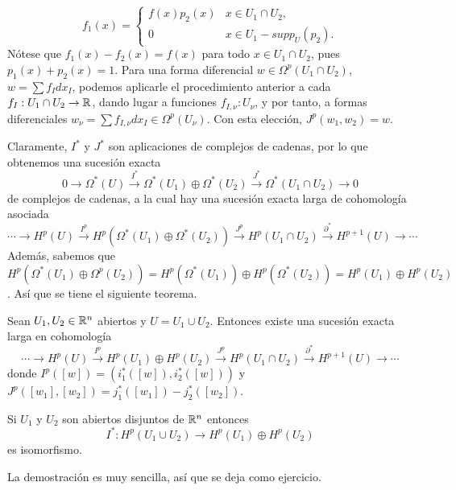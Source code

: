 \documentclass[CV.tex]{subfiles}
\begin{document}
\begin{dem}
\[
f_1(x)=\begin{cases}
f(x)p_2(x) & x\in U_1\cap U_2,\\
0 & x\in U_1-supp_U(p_2).
\end{cases}
\]
Nótese que $f_1(x)-f_2(x)=f(x)$ para todo $x\in U_1\cap U_2$, pues $p_1(x)+p_2(x)=1$. Para una forma diferencial $w\in \Omega^p(U_1\cap U_2)$, $w=\sum f_Idx_I$, podemos aplicarle el procedimiento anterior a cada $f_I:U_1\cap U_2\to\mathbb{R}$, dando lugar a funciones $f_{I,\nu}:U_{\nu}$, y por tanto, a formas diferenciales $w_{\nu}=\sum f_{I,\nu}dx_I\in\Omega^p(U_{\nu})$. Con esta elección, $J^p(w_1,w_2)=w$. 
\QED
\end{dem}

Claramente, $I^*$ y $J^*$ son aplicaciones de complejos de cadenas, por lo que obtenemos una sucesión exacta
\[
0\to \Omega^*(U)\overset{I^*}{\to}\Omega^*(U_1)\oplus\Omega^*(U_2)\overset{J^*}{\to}\Omega^*(U_1\cap U_2)\to 0
\]
de complejos de cadenas, a la cual hay una sucesión exacta larga de cohomología asociada
\[
\cdots\to H^p(U)\overset{I^p}{\to}H^p(\Omega^*(U_1)\oplus \Omega^*(U_2))\overset{J^p}{\to}H^p(U_1\cap U_2)\overset{\partial^*}{\to}H^{p+1}(U)\to \cdots
\]
Además, sabemos que $H^p(\Omega^*(U_1)\oplus \Omega^p(U_2))=H^p(\Omega^*(U_1))\oplus H^p(\Omega^*(U_2))=H^p(U_1)\oplus H^p(U_2)$. Así que se tiene el siguiente teorema.

\begin{teorema} Sean $U_1,U_2\in\mathbb{R}^n$ abiertos y $U=U_1\cup U_2$. Entonces existe una sucesión exacta larga en cohomología
\[
\cdots\to H^p(U)\overset{I^p}{\to}H^p(U_1)\oplus H^p(U_2)\overset{J^p}{\to}H^p(U_1\cap U_2)\overset{\partial^*}{\to}H^{p+1}(U)\to \cdots
\]
donde $I^p([w])=(i_1^*([w]), i_2^*([w]))$ y $J^p([w_1],[w_2])=j_1^*([w_1])-j_2^*([w_2])$.
\end{teorema}

\begin{coro}\label{5.3}
Si $U_1$ y $U_2$ son abiertos disjuntos de $\mathbb{R}^n$ entonces
\[
I^*: H^p(U_1\cup U_2)\to H^p(U_1)\oplus H^p(U_2)
\]
es isomorfismo.
\end{coro}

La demostración es muy sencilla, así que se deja como ejercicio.
\end{document}

